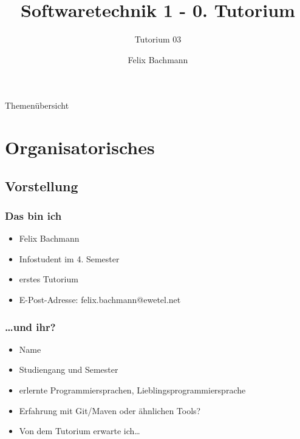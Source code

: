 \documentclass[18pt]{beamer}
\title[SWT1]{Softwaretechnik 1 - 0. Tutorium}
\subtitle{Tutorium 03}
\author{Felix Bachmann}
\institute{KIT - Institut für Programmstrukturen und Datenorganisation (IPD)}
\begin{document}

\begin{frame}
\titlepage
\end{frame}

\begin{frame}{Themenübersicht}
\tableofcontents
\end{frame}

\section{Organisatorisches}
	\subsection{Vorstellung}
		\begin{frame}
			\frametitle{Das bin ich}
			\begin{itemize}
				\item Felix Bachmann
				\item Infostudent im 4. Semester
				\item erstes Tutorium
				\item E-Post-Adresse: felix.bachmann@ewetel.net
			\end{itemize}
		\end{frame}
		\begin{frame}
			\frametitle{\dots und ihr?}
			\begin{itemize}
				\item Name
				\item Studiengang und Semester
				\item erlernte Programmiersprachen, Lieblingsprogrammiersprache
				\item Erfahrung mit Git/Maven oder ähnlichen Tools?
				\item Von dem Tutorium erwarte ich\dots
			\end{itemize}
		\end{frame}
		
\end{document}
